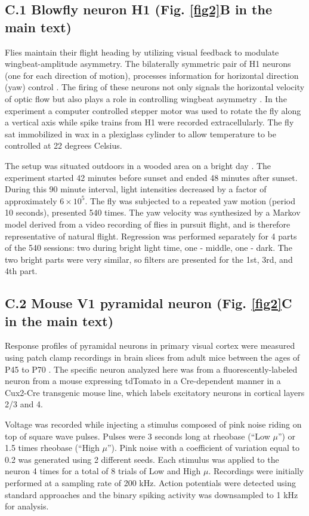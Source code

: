 \subsection*{C.1 Blowfly neuron H1 (Fig. \ref{fig2}B in the main text)}
Flies maintain their flight heading by utilizing visual feedback to modulate wingbeat-amplitude asymmetry. The bilaterally symmetric pair of H1 neurons (one for each direction of motion), processes information for horizontal direction (yaw) control \citep{rieke1999spikes}. The firing of these neurons not only signals the horizontal velocity of optic flow \citep{rieke1999spikes} but also plays a role in controlling wingbeat asymmetry \citep{williams2018blowfly}. In the experiment a computer controlled stepper motor was used to rotate the fly along a vertical axis while spike trains from H1 were recorded extracellularly. The fly sat immobilized in wax in a plexiglass cylinder to allow temperature to be controlled at 22 degrees Celsius. 

The setup was situated outdoors in a wooded area on a bright day \citep{lewen2001neural}. The experiment started 42 minutes before sunset and ended 48 minutes after sunset. During this 90 minute interval, light intensities decreased by a factor of approximately $6 \times 10^5$. The fly was subjected to a repeated yaw motion (period 10 seconds), presented 540 times. The yaw velocity was synthesized by a Markov model derived from a video recording of flies in pursuit flight, and is therefore representative of natural flight. Regression was performed separately for 4 parts of the 540 sessions: two during bright light time, one - middle, one - dark. The two bright parts were very similar, so filters are presented for the 1st, 3rd, and 4th part.

\subsection*{C.2 Mouse V1 pyramidal neuron (Fig. \ref{fig2}C in the main text)}
Response profiles of pyramidal neurons in primary visual cortex were measured using patch clamp recordings in brain slices from adult mice between the ages of P45 to P70 \citep{teeter2018generalized}. The specific neuron analyzed here was from a fluorescently-labeled neuron from a mouse expressing tdTomato in a Cre-dependent manner in a Cux2-Cre transgenic mouse line, which labels excitatory neurons in cortical layers 2/3 and 4. 

Voltage was recorded while injecting a stimulus composed of pink noise riding on top of square wave pulses. Pulses were 3 seconds long at rheobase (“Low $\mu$”) or 1.5 times rheobase (“High $\mu$”). Pink noise with a coefficient of variation equal to 0.2 was generated using 2 different seeds. Each stimulus was applied to the neuron 4 times for a total of 8 trials of Low and High $\mu$. Recordings were initially performed at a sampling rate of 200 kHz. Action potentials were detected using standard approaches and the binary spiking activity was downsampled to 1 kHz for analysis.


